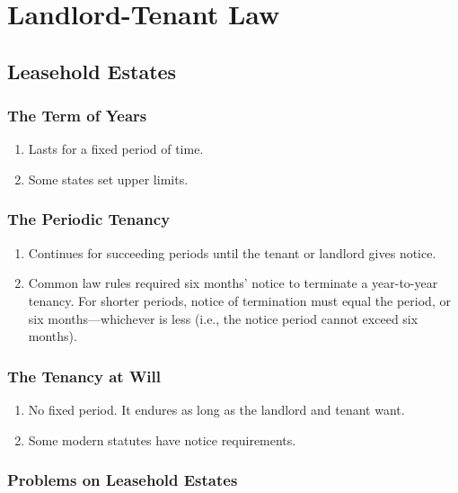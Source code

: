\section{Landlord-Tenant Law}

\subsection{Leasehold Estates}

\subsubsection{The Term of Years}

\begin{enumerate}
    \item Lasts for a fixed period of time.
    \item Some states set upper limits.
\end{enumerate}

\subsubsection{The Periodic Tenancy}

\begin{enumerate}
    \item Continues for succeeding periods until the tenant or landlord gives 
    notice.
    \item Common law rules required six months' notice to terminate a 
    year-to-year tenancy. For shorter periods, notice of termination must 
    equal the period, or six months---whichever is less (i.e., the notice 
    period cannot exceed six months).
\end{enumerate}

\subsubsection{The Tenancy at Will}

\begin{enumerate}
    \item No fixed period. It endures as long as the landlord and tenant want.
    \item Some modern statutes have notice requirements.
\end{enumerate}

\subsubsection{Problems on Leasehold Estates}

